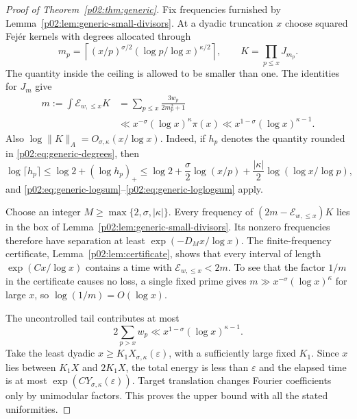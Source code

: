 \documentclass[11pt,letterpaper]{article}
\theoremstyle{definition}
\theoremstyle{remark}
\newcommand{\eps}{\varepsilon}
\newcommand{\1}{\mathbf 1}
\begin{document}
\begin{proof}[Proof of Theorem~\ref{p02:thm:generic}]
Fix frequencies furnished by Lemma~\ref{p02:lem:generic-small-divisors}.
At a dyadic truncation $x$ choose squared Fej\'er kernels with degrees
allocated through
\begin{equation}\label{p02:eq:generic-degrees}
 m_p=\left\lceil
 (x/p)^{\sigma/2}(\log p/\log x)^{\kappa/2}
 \right\rceil,
 \qquad K=\prod_{p\le x}J_{m_p}.
\end{equation}
The quantity inside the ceiling is allowed to be smaller than one.
The identities for $J_m$ give
\begin{align*}
 m:=\int \mathcal E_{w,\le x}K
 &=\sum_{p\le x}\frac{3w_p}{2m_p^2+1}\\
 &\ll x^{-\sigma}(\log x)^\kappa\pi(x)
 \ll x^{1-\sigma}(\log x)^{\kappa-1}.
\end{align*}
Also $\log\|K\|_A=O_{\sigma,\kappa}(x/\log x)$.
Indeed, if $h_p$ denotes the quantity rounded in
\eqref{p02:eq:generic-degrees}, then
\[
 \log\lceil h_p\rceil\le\log2+(\log h_p)_+
 \le\log2+\frac\sigma2\log(x/p)
       +\frac{|\kappa|}2\log(\log x/\log p),
\]
and \eqref{p02:eq:generic-logsum}--\eqref{p02:eq:generic-loglogsum} apply.

Choose an integer $M\ge\max\{2,\sigma,|\kappa|\}$. Every frequency
of $(2m-\mathcal E_{w,\le x})K$ lies in the box of
Lemma~\ref{p02:lem:generic-small-divisors}. Its nonzero frequencies
therefore have separation at least $\exp(-D_Mx/\log x)$.
The finite-frequency certificate, Lemma~\ref{p02:lem:certificate}, shows
that every interval of length $\exp(Cx/\log x)$ contains a time with
$\mathcal E_{w,\le x}<2m$. To see that the factor $1/m$ in the certificate
causes no loss, a single fixed prime gives
$m\gg x^{-\sigma}(\log x)^\kappa$ for large $x$, so
$\log(1/m)=O(\log x)$.

The uncontrolled tail contributes at most
\[
 2\sum_{p>x}w_p\ll x^{1-\sigma}(\log x)^{\kappa-1}.
\]
Take the least dyadic $x\ge K_1X_{\sigma,\kappa}(\eps)$, with a
sufficiently large fixed $K_1$. Since $x$ lies between $K_1X$ and
$2K_1X$, the total energy is less than $\eps$ and the elapsed time is
at most $\exp(CY_{\sigma,\kappa}(\eps))$. Target translation changes
Fourier coefficients only by unimodular factors. This proves the
upper bound with all the stated uniformities.


\end{proof}
\end{document}
